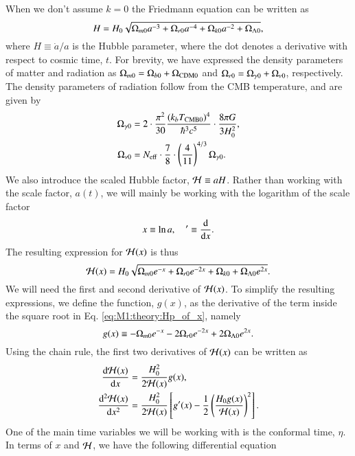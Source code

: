 When we don't assume $k=0$ the Friedmann equation can be written as 
\begin{equation}
    H = H_0 \sqrt{\Omega_{m0} a^{-3} + \Omega_{r0} a^{-4} + \Omega_{k0} a^{-2} + \Omega_{\Lambda 0}}, \label{eq:M1:theory:Friedmann_H_omegas}
\end{equation}
where $H\equiv\dot{a}/a$ is the Hubble parameter, where the dot denotes a derivative with respect to cosmic time, $t$. For brevity, we have expressed the density parameters of matter and radiation as $\Omega_{m0}=\Omega_{b0}+\Omega_\mathrm{CDM0}$ and $\Omega_{r0}=\Omega_{\gamma 0}+\Omega_{\nu 0}$, respectively. The density parameters of radiation follow from the CMB temperature, and are given by 
\begin{align}
    \Omega_{\gamma 0} &= 2 \cdot \frac{\pi^2}{30} \frac{(k_b T_\mathrm{CMB0})^4}{\hbar^3 c^5} \cdot \frac{8\pi G}{3H_0^2}, \label{eq:M1:theory:omega_gamma0_T} \\
    \Omega_{\nu 0} &= N_\mathrm{eff} \cdot \frac{7}{8} \cdot \left( \frac{4}{11} \right)^{4/3} \Omega_{\gamma 0}. \label{eq:M1:theory:omega_nu0_T}
\end{align}
%
We also introduce the scaled Hubble factor, $\mathcal{H}\equiv aH$. Rather than working with the scale factor, $a(t)$, we will mainly be working with the logarithm of the scale factor 
\begin{equation} \label{eq:M1:theory:x_dx_definitions}
    x\equiv \ln a,\quad '\equiv \dv{x}. 
\end{equation}
%
%
The resulting expression for $\mathcal{H}(x)$ is thus  
\begin{equation} \label{eq:M1:theory:Hp_of_x}
    \mathcal{H}(x) = H_0 \sqrt{\Omega_{m0} e^{-x} + \Omega_{r0} e^{-2x} + \Omega_{k0} + \Omega_{\Lambda 0} e^{2x}}. 
\end{equation}
%
%
We will need the first and second derivative of $\mathcal{H}(x)$. To simplify the resulting expressions, we define the function, $g(x)$, as the derivative of the term inside the square root in Eq. \eqref{eq:M1:theory:Hp_of_x}, namely 
\begin{equation}
    g(x) \equiv -\Omega_{m0} e^{-x} -2\Omega_{r0} e^{-2x} + 2\Omega_{\Lambda 0} e^{2x}. \label{eq:M1:theory:g_of_x} 
\end{equation} 
%
Using the chain rule, the first two derivatives of $\mathcal{H}(x)$ can be written as 
\begin{align} 
    \dv{\mathcal{H}(x)}{x} &= \frac{H_0^2}{2\mathcal{H}(x)}g(x), \label{eq:M1:theory:dHp_dx} \\
    \dv[2]{\mathcal{H}(x)}{x} &= \frac{H_0^2}{2\mathcal{H}(x)}\left[ g'(x) - \frac{1}{2}\left( \frac{H_0 g(x)}{\mathcal{H}(x)} \right)^2 \right]. \label{eq:M1:theory:ddHp_ddx}
\end{align}
%
One of the main time variables we will be working with is the conformal time, $\eta$. In terms of $x$ and $\mathcal{H}$, we have the following differential equation 
